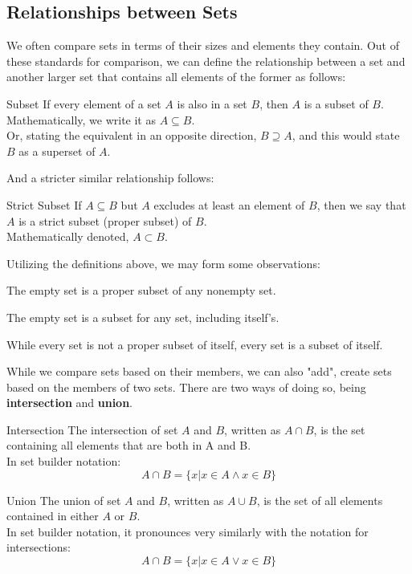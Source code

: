 \subsection{Relationships between Sets}
We often compare sets in terms of their sizes and elements they contain. Out of these standards for comparison, we can define the relationship between a set and another larger set that contains all elements of the former as follows:
\begin{ln-define}{Subset}{}
    If every element of a set $A$ is also in a set $B$, then $A$ is a subset of $B$. \\
    Mathematically, we write it as $A \subseteq B$. \\
    Or, stating the equivalent in an opposite direction, $B \supseteq A$, and this would state $B$ as a superset of $A$.
\end{ln-define}
And a stricter similar relationship follows:
\begin{ln-define}{Strict Subset}{}
    If $A \subseteq B$ but $A$ excludes at least an element of $B$, then we say that $A$ is a strict subset (proper subset) of $B$. \\
    Mathematically denoted, $A \subset B$.
\end{ln-define}
Utilizing the definitions above, we may form some observations:
\begin{bindenum}
    \item The empty set is a proper subset of any nonempty set.
    \item The empty set is a subset for any set, including itself's.
    \item While every set is not a proper subset of itself, every set is a subset of itself.
\end{bindenum}
While we compare sets based on their members, we can also "add", create sets based on the members of two sets. There are two ways of doing so, being \textbf{intersection} and \textbf{union}.
\begin{ln-define}{Intersection}{}
    The intersection of set $A$ and $B$, written as $A \cap B$, is the set containing all elements that are both in A and B. \\
    In set builder notation:
    \[A \cap B = \{x | x \in A \land x \in B\}\]
\end{ln-define}
\begin{ln-define}{Union}{}
    The union of set $A$ and $B$, written as $A \cup B$, is the set of all elements contained in either $A$ or $B$. \\
    In set builder notation, it pronounces very similarly with the notation for intersections:
    \[A \cap B = \{x | x \in A \lor x \in B\}\]
\end{ln-define}
